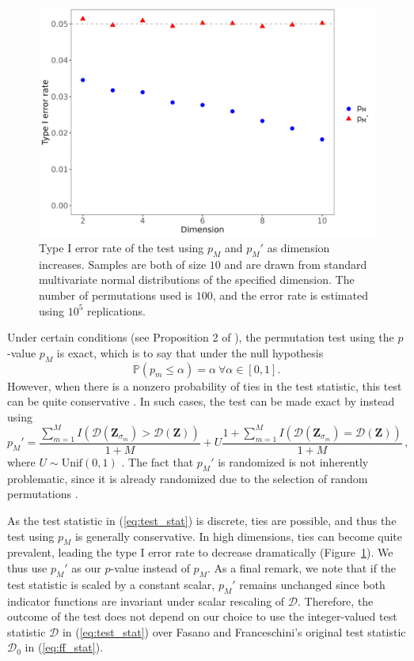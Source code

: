 \begin{figure}[htbp]
\centering
\includegraphics[scale=0.4]{figures/fig3.png}
\caption{Type I error rate of the test using $p_{M}$ and $p_{M}'$ as dimension increases. Samples are both of size $10$ and are drawn from standard multivariate normal distributions of the specified dimension. The number of permutations used is $100$, and the error rate is estimated using $10^{5}$ replications.}
\label{figure:pvalues}
\end{figure}

Under certain conditions (see Proposition 2 of \citealt{hemerik2018}), the permutation test using the $p$-value $p_{M}$ is exact, which is to say that under the null hypothesis
\begin{equation*}
\mathbb{P}(p_{m}\leq\alpha)=\alpha \ \forall\alpha\in[0,1].
\end{equation*}
However, when there is a nonzero probability of ties in the test statistic, this test can be quite conservative \citep{hemerik2018}. In such cases, the test can be made exact by instead using
\begin{equation}
p_{M}'=\frac{\sum_{m=1}^{M}I(\mathcal{D}(\mathbf{Z}_{\sigma_{m}})>\mathcal{D}(\mathbf{Z}))}{1+M}+U\frac{1+\sum_{m=1}^{M}I(\mathcal{D}(\mathbf{Z}_{\sigma_{m}})=\mathcal{D}(\mathbf{Z}))}{1+M}\,,
\end{equation}
where $U\sim\mathrm{Unif}(0,1)$ \citep{hoeffding1952,hemerik2018}. The fact that $p_{M}'$ is randomized is not inherently problematic, since it is already randomized due to the selection of random permutations \citep{hemerik2018}.

As the test statistic in (\ref{eq:test_stat}) is discrete, ties are possible, and thus the test using $p_{M}$ is generally conservative.  In high dimensions, ties can become quite prevalent, leading the type I error rate to decrease dramatically (Figure~\ref{figure:pvalues}). We thus use $p_{M}'$ as our $p$-value instead of $p_{M}$. As a final remark, we note that if the test statistic is scaled by a constant scalar, $p_{M}'$ remains unchanged since both indicator functions are invariant under scalar rescaling of $\mathcal{D}$. Therefore, the outcome of the test does not depend on our choice to use the integer-valued test statistic $\mathcal{D}$ in (\ref{eq:test_stat}) over Fasano and Franceschini's original test statistic $\mathcal{D}_{0}$ in (\ref{eq:ff_stat}).

